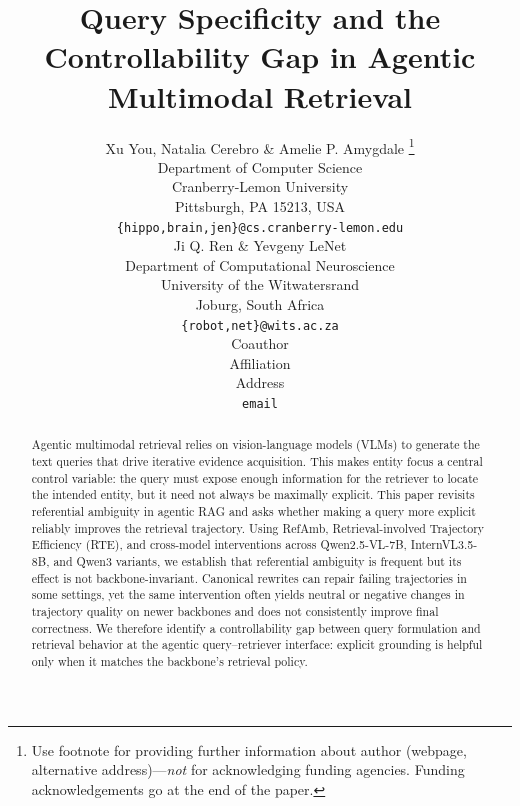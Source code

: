 \documentclass{article} %
\title{Query Specificity and the Controllability Gap in Agentic Multimodal Retrieval}
\author{Xu You, Natalia Cerebro \& Amelie P. Amygdale \thanks{ Use footnote for providing further information
about author (webpage, alternative address)---\emph{not} for acknowledging
funding agencies.  Funding acknowledgements go at the end of the paper.} \\
Department of Computer Science\\
Cranberry-Lemon University\\
Pittsburgh, PA 15213, USA \\
\texttt{\{hippo,brain,jen\}@cs.cranberry-lemon.edu} \\
\And
Ji Q. Ren \& Yevgeny LeNet \\
Department of Computational Neuroscience \\
University of the Witwatersrand \\
Joburg, South Africa \\
\texttt{\{robot,net\}@wits.ac.za} \\
\AND
Coauthor \\
Affiliation \\
Address \\
\texttt{email}
}
\begin{document}
\maketitle

\begin{abstract}
Agentic multimodal retrieval relies on vision-language models (VLMs) to generate the text queries that drive iterative evidence acquisition.
This makes entity focus a central control variable: the query must expose enough information for the retriever to locate the intended entity, but it need not always be maximally explicit.
This paper revisits referential ambiguity in agentic RAG and asks whether making a query more explicit reliably improves the retrieval trajectory.
Using RefAmb, Retrieval-involved Trajectory Efficiency (RTE), and cross-model interventions across Qwen2.5-VL-7B, InternVL3.5-8B, and Qwen3 variants, we establish that referential ambiguity is frequent but its effect is not backbone-invariant.
Canonical rewrites can repair failing trajectories in some settings, yet the same intervention often yields neutral or negative changes in trajectory quality on newer backbones and does not consistently improve final correctness.
We therefore identify a controllability gap between query formulation and retrieval behavior at the agentic query--retriever interface: explicit grounding is helpful only when it matches the backbone's retrieval policy.
\end{abstract}
\end{document}

